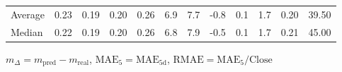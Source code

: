\begin{threeparttable}
{\begin{tabular}{lrrrrrrrrrrr}
Average &          0.23 &          0.19 &          0.20 &        0.26 &                 6.9 &                 7.7 &       -0.8 &                 0.1 &              1.7 &            0.20 &                  39.50 \\
 Median &          0.22 &          0.19 &          0.20 &        0.26 &                 6.8 &                 7.9 &       -0.5 &                 0.1 &              1.7 &            0.21 &                  45.00 \\
\bottomrule
\end{tabular}
}
\begin{tablenotes}\footnotesize
\item $m_\Delta=m_{\text{pred}}-m_{\text{real}}$,
$\mathrm{MAE}_5=\mathrm{MAE}_{5\text{d}}$,
$\mathrm{RMAE}=\mathrm{MAE}_5/\text{Close}$
\end{tablenotes}
\end{threeparttable}
\endgroup

